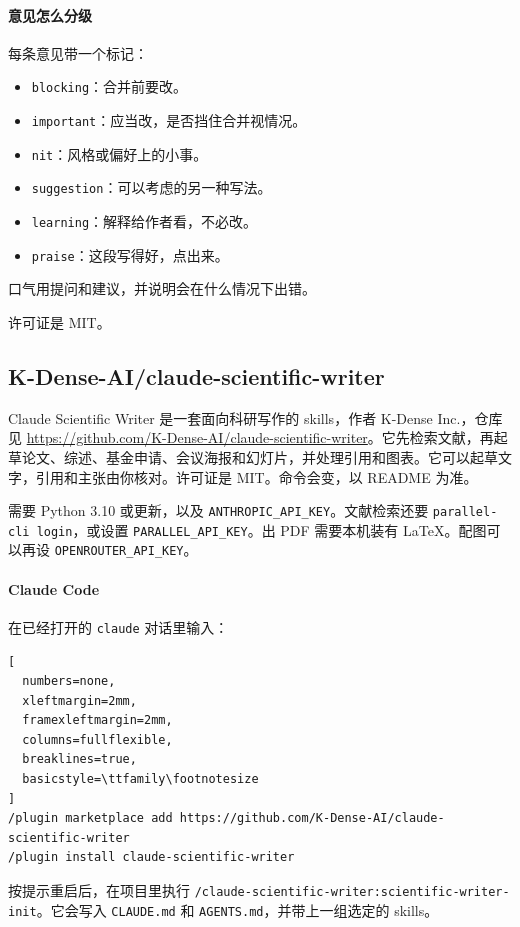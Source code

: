 \paragraph{意见怎么分级}
每条意见带一个标记：
\begin{itemize}
\item \verb|blocking|：合并前要改。
\item \verb|important|：应当改，是否挡住合并视情况。
\item \verb|nit|：风格或偏好上的小事。
\item \verb|suggestion|：可以考虑的另一种写法。
\item \verb|learning|：解释给作者看，不必改。
\item \verb|praise|：这段写得好，点出来。
\end{itemize}
口气用提问和建议，并说明会在什么情况下出错。

许可证是 MIT。







\subsection{K-Dense-AI/claude-scientific-writer}
Claude Scientific Writer 是一套面向科研写作的 skills，作者 K-Dense Inc.，仓库见 \url{https://github.com/K-Dense-AI/claude-scientific-writer}。它先检索文献，再起草论文、综述、基金申请、会议海报和幻灯片，并处理引用和图表。它可以起草文字，引用和主张由你核对。许可证是 MIT。命令会变，以 README 为准。

需要 Python 3.10 或更新，以及 \verb|ANTHROPIC_API_KEY|。文献检索还要 \verb|parallel-cli login|，或设置 \verb|PARALLEL_API_KEY|。出 PDF 需要本机装有 LaTeX。配图可以再设 \verb|OPENROUTER_API_KEY|。

\paragraph{Claude Code}
在已经打开的 \verb|claude| 对话里输入：
\begin{lstlisting}[
  numbers=none,
  xleftmargin=2mm,
  framexleftmargin=2mm,
  columns=fullflexible,
  breaklines=true,
  basicstyle=\ttfamily\footnotesize
]
/plugin marketplace add https://github.com/K-Dense-AI/claude-scientific-writer
/plugin install claude-scientific-writer
\end{lstlisting}
按提示重启后，在项目里执行 \verb|/claude-scientific-writer:scientific-writer-init|。它会写入 \verb|CLAUDE.md| 和 \verb|AGENTS.md|，并带上一组选定的 skills。

